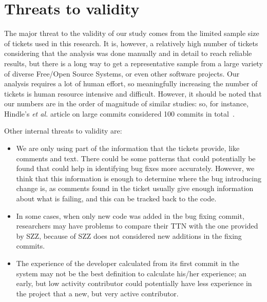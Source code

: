 \documentclass[10pt, conference]{IEEEtran}
\begin{document}

\section{Threats to validity}
\label{sec:threats}

The major threat to the validity of our study comes from the limited sample size of tickets used in this research. It is, however, a relatively high number of tickets considering that the analysis was done manually and in detail to reach reliable results, but there is a long way to get a representative sample from a large variety of diverse Free/Open Source Systems, or even other software projects. Our analysis requires a lot of human effort, so meaningfully increasing the number of tickets is human resource intensive and difficult. However, it should be noted that our numbers are in the order of magnitude of similar studies: so, for instance, Hindle's \emph{et al.} article on large commits considered 100 commits in total~\cite{hindle2008large}.

Other internal threats to validity are:

\begin{itemize}
    \item We are only using part of the information that the tickets provide, like comments and text. There could be some patterns that could potentially be found that could help in identifying bug fixes more accurately. However, we think that this information is enough to determine where the bug introducing change is, as comments found in the ticket usually give enough information about what is failing, and this can be tracked back to the code.
    \item In some cases, when only new code was added in the bug fixing commit, researchers may have problems to compare their TTN with the one provided by SZZ, because of SZZ does not considered new additions in the fixing commits. 
    \item The experience of the developer calculated from its first commit in the system may not be the best definition to calculate his/her experience; an early, but low activity contributor could potentially have less experience in the project that a new, but very active contributor.
\end{itemize}
\end{document}
